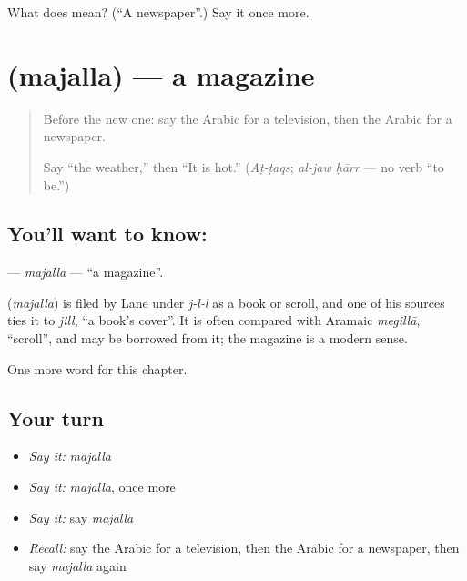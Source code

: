 \begin{tcolorbox}[breakable,colback=teal!4,colframe=teal!35!black,title={Before you move on}]
What does  mean? (\textquotedblleft{}A newspaper\textquotedblright{}.) Say it once more.
\end{tcolorbox}
\section[\texorpdfstring{\ar{مجلة} (majalla)}{مجلة (majalla)}]{ (majalla) — a magazine}

\label{lesson:AR-C117-majalla}



\begin{quote}
Before the new one: say the Arabic for a television, then the Arabic for a newspaper.

Say \textquotedblleft{}the weather,\textquotedblright{} then \textquotedblleft{}It is hot.\textquotedblright{} (\emph{Aṭ-ṭaqs}; \emph{al-jaw ḥārr} — no verb \textquotedblleft{}to be.\textquotedblright{})
\end{quote}

\subsection*{You'll want to know: }
\textbf{} — \emph{majalla} — \textquotedblleft{}a magazine\textquotedblright{}.

\begin{cousinweb}
\textbf{} (\emph{majalla}) is filed by Lane under \emph{j-l-l} as a book or scroll, and one of his sources ties it to \emph{jill}, \textquotedblleft{}a book's cover\textquotedblright{}. It is often compared with Aramaic \emph{megillā}, \textquotedblleft{}scroll\textquotedblright{}, and may be borrowed from it; the magazine is a modern sense.
\end{cousinweb}

\begin{grammarlens}[title={What you've built}]
One more word for this chapter.
\end{grammarlens}

\subsection*{Your turn}
\begin{itemize}
\raggedright
  \item \emph{Say it:} \emph{majalla}
  \item \emph{Say it:} \emph{majalla}, once more
  \item \emph{Say it:} say \emph{majalla}
  \item \emph{Recall:} say the Arabic for a television, then the Arabic for a newspaper, then say \emph{majalla} again
\end{itemize}

